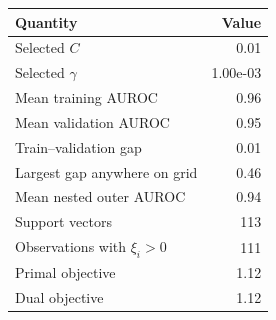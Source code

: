 \begin{tabular}{lr}
\toprule
Quantity & Value \\
\midrule
Selected $C$ & 0.01 \\
Selected $\gamma$ & 1.00e-03 \\
Mean training AUROC & 0.96 \\
Mean validation AUROC & 0.95 \\
Train--validation gap & 0.01 \\
Largest gap anywhere on grid & 0.46 \\
Mean nested outer AUROC & 0.94 \\
Support vectors & 113 \\
Observations with $\xi_i>0$ & 111 \\
Primal objective & 1.12 \\
Dual objective & 1.12 \\
\bottomrule
\end{tabular}
